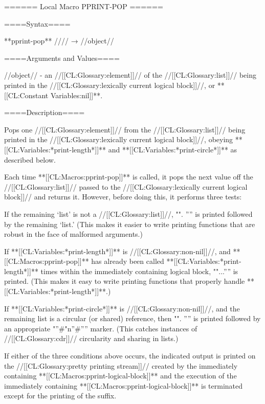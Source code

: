 ====== Local Macro PPRINT-POP ======

====Syntax====

**pprint-pop** //\noargs// → //object//

====Arguments and Values====

//object// - an //[[CL:Glossary:element]]// of the //[[CL:Glossary:list]]// being printed in the //[[CL:Glossary:lexically current logical block]]//, or **[[CL:Constant Variables:nil]]**.

====Description====

Pops one //[[CL:Glossary:element]]// from the //[[CL:Glossary:list]]// being printed in the //[[CL:Glossary:lexically current logical block]]//, obeying **[[CL:Variables:*print-length*]]** and **[[CL:Variables:*print-circle*]]** as described below.

Each time **[[CL:Macros:pprint-pop]]** is called, it pops the next value off the //[[CL:Glossary:list]]// passed to the //[[CL:Glossary:lexically current logical block]]// and returns it. However, before doing this, it performs three tests:

\beginlist \item{\bull} If the remaining `list' is not a //[[CL:Glossary:list]]//, "". '''' is printed followed by the remaining `list.' (This makes it easier to write printing functions that are robust in the face of malformed arguments.)

\item{\bull} If **[[CL:Variables:*print-length*]]** is //[[CL:Glossary:non-nil]]//, and **[[CL:Macros:pprint-pop]]** has already been called **[[CL:Variables:*print-length*]]** times within the immediately containing logical block, ""...'''' is printed. (This makes it easy to write printing functions that properly handle **[[CL:Variables:*print-length*]]**.)

\item{\bull} If **[[CL:Variables:*print-circle*]]** is //[[CL:Glossary:non-nil]]//, and the remaining list is a circular (or shared) reference, then "". '''' is printed followed by an appropriate "''#"n''#'''' marker. (This catches instances of //[[CL:Glossary:cdr]]// circularity and sharing in lists.) \endlist

If either of the three conditions above occurs, the indicated output is printed on the //[[CL:Glossary:pretty printing stream]]// created by the immediately containing **[[CL:Macros:pprint-logical-block]]** and the execution of the immediately containing **[[CL:Macros:pprint-logical-block]]** is terminated except for the printing of the suffix.

